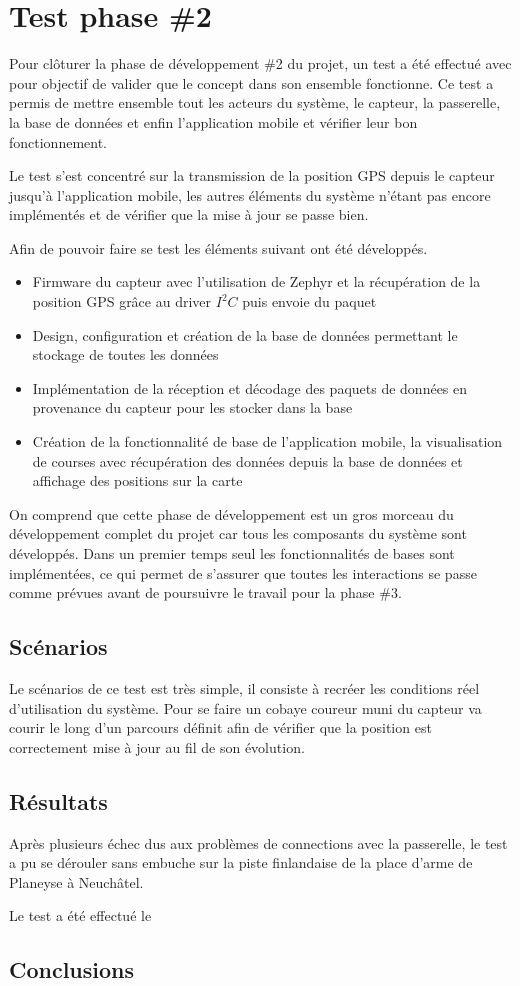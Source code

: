 
\chapter{Test phase \#2}\label{ch:test_2}

Pour clôturer la phase de développement \#2 du projet, un test a été effectué avec pour objectif de valider que le concept dans son ensemble fonctionne. Ce test a permis de mettre ensemble tout les acteurs du système, le capteur, la passerelle, la base de données et enfin l'application mobile et vérifier leur bon fonctionnement.

Le test s'est concentré sur la transmission de la position GPS depuis le capteur jusqu'à l'application mobile, les autres éléments du système n'étant pas encore implémentés et de vérifier que la mise à jour se passe bien.

Afin de pouvoir faire se test les éléments suivant ont été développés.

\begin{itemize}
\item Firmware du capteur avec l'utilisation de Zephyr et la récupération de la position GPS grâce au driver $I^{2}C$ puis envoie du paquet
\item Design, configuration et création de la base de données permettant le stockage de toutes les données
\item Implémentation de la réception et décodage des paquets de données en provenance du capteur pour les stocker dans la base
\item Création de la fonctionnalité de base de l'application mobile, la visualisation de courses avec récupération des données depuis la base de données et affichage des positions sur la carte
\end{itemize}

On comprend que cette phase de développement est un gros morceau du développement complet du projet car tous les composants du système sont développés. Dans un premier temps seul les fonctionnalités de bases sont implémentées, ce qui permet de s'assurer que toutes les interactions se passe comme prévues avant de poursuivre le travail pour la phase \#3.


\section{Scénarios}

Le scénarios de ce test est très simple, il consiste à recréer les conditions réel d'utilisation du système. Pour se faire un cobaye coureur muni du capteur va courir le long d'un parcours définit afin de vérifier que la position est correctement mise à jour au fil de son évolution.

\section{Résultats}

Après plusieurs échec dus aux problèmes de connections avec la passerelle, le test a pu se dérouler sans embuche sur la piste finlandaise de la place d'arme de Planeyse à Neuchâtel.

Le test a été effectué le 

\section{Conclusions}